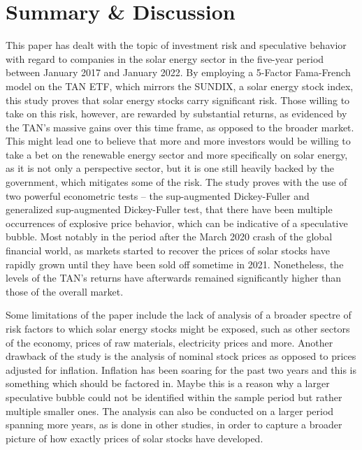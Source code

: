\documentclass[11pt]{article}
\begin{document}
\section{Summary \& Discussion}
This paper has dealt with the topic of investment risk and speculative behavior with regard to companies in the solar energy sector in the five-year period between January 2017 and January 2022. By employing a 5-Factor Fama-French model on the TAN ETF, which mirrors the SUNDIX, a solar energy stock index, this study proves that solar energy stocks carry significant risk. Those willing to take on this risk, however, are rewarded by substantial returns, as evidenced by the TAN's massive gains over this time frame, as opposed to the broader market. This might lead one to believe that more and more investors would be willing to take a bet on the renewable energy sector and more specifically on solar energy, as it is not only a perspective sector, but it is one still heavily backed by the government, which mitigates some of the risk. The study proves with the use of two powerful econometric tests -- the sup-augmented Dickey-Fuller and generalized sup-augmented Dickey-Fuller test, that there have been multiple occurrences of explosive price behavior, which can be indicative of a speculative bubble. Most notably in the period after the March 2020 crash of the global financial world, as markets started to recover the prices of solar stocks have rapidly grown until they have been sold off sometime in 2021. Nonetheless, the levels of the TAN's returns have afterwards remained significantly higher than those of the overall market.
\newline

Some limitations of the paper include the lack of analysis of a broader spectre of risk factors to which solar energy stocks might be exposed, such as other sectors of the economy, prices of raw materials, electricity prices and more. Another drawback of the study is the analysis of nominal stock prices as opposed to prices adjusted for inflation. Inflation has been soaring for the past two years and this is something which should be factored in. Maybe this is a reason why a larger speculative bubble could not be identified within the sample period but rather multiple smaller ones. The analysis can also be conducted on a larger period spanning more years, as is done in other studies, in order to capture a broader picture of how exactly prices of solar stocks have developed.
\newline
\end{document}
